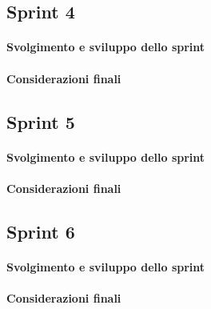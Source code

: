 \subsection{Sprint 4}
\paragraph{Svolgimento e sviluppo dello sprint}
\paragraph{Considerazioni finali}

\subsection{Sprint 5}
\paragraph{Svolgimento e sviluppo dello sprint}
\paragraph{Considerazioni finali}

\subsection{Sprint 6}
\paragraph{Svolgimento e sviluppo dello sprint}
\paragraph{Considerazioni finali}